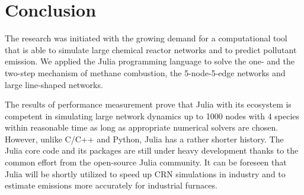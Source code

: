 \chapter{Conclusion} \label{ch:conclusion}

The research was initiated with the growing demand for a computational tool that is able to simulate large chemical reactor networks and to predict pollutant emission. We applied the Julia programming language to solve the one- and the two-step mechanism of methane combustion, the 5-node-5-edge networks and large line-shaped networks. 

The results of performance measurement prove that Julia with its ecosystem is competent in simulating large network dynamics up to 1000 nodes with 4 species within reasonable time as long as appropriate numerical solvers are chosen. However, unlike C/C++ and Python, Julia has a rather shorter history. The Julia core code and its packages are still under heavy development thanks to the common effort from the open-source Julia community. It can be foreseen that Julia will be shortly utilized to speed up CRN simulations in industry and to estimate emissions more accurately for industrial furnaces.